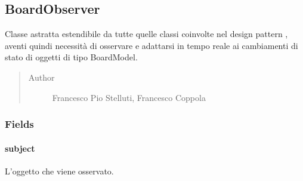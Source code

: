 \documentclass[letterpaper,10pt,italian,openany,oneside]{sphinxmanual}
\begin{document}
\subsection{BoardObserver}
\label{\detokenize{source/it/unicam/cs/pa/mastermind/ui/BoardObserver:boardobserver}}\label{\detokenize{source/it/unicam/cs/pa/mastermind/ui/BoardObserver::doc}}

\begin{fulllineitems}
\label{\detokenize{source/it/unicam/cs/pa/mastermind/ui/BoardObserver:it.unicam.cs.pa.mastermind.ui.BoardObserver}}
Classe astratta estendibile da tutte quelle classi coinvolte nel design pattern , aventi quindi necessità di osservare e adattarsi in tempo reale ai cambiamenti di stato di oggetti di tipo BoardModel.
\begin{quote}\begin{description}
\item[{Author}] \leavevmode
Francesco Pio Stelluti, Francesco Coppola

\end{description}\end{quote}

\end{fulllineitems}



\subsubsection{Fields}
\label{\detokenize{source/it/unicam/cs/pa/mastermind/ui/BoardObserver:fields}}

\paragraph{subject}
\label{\detokenize{source/it/unicam/cs/pa/mastermind/ui/BoardObserver:subject}}

\begin{fulllineitems}
\label{\detokenize{source/it/unicam/cs/pa/mastermind/ui/BoardObserver:it.unicam.cs.pa.mastermind.ui.BoardObserver.subject}}
L’oggetto che viene osservato.

\end{fulllineitems}
\end{document}
